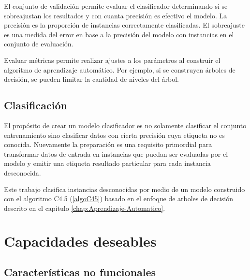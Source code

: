 El conjunto de validación permite evaluar el clasificador determinando
si se sobreajustan los resultados y con cuanta precisión es efectivo
el modelo. La precisión es la proporción de instancias correctamente
clasificadas. El sobreajuste es una medida del error en base a la
precisión del modelo con instancias en el conjunto de evaluación.

Evaluar métricas permite realizar ajustes a los parámetros al construir
el algoritmo de aprendizaje automático. Por ejemplo, si se construyen
árboles de decisión, se pueden limitar la cantidad de niveles del
árbol.

\subsection{Clasificación}

El propósito de crear un modelo clasificador es no solamente clasificar
el conjunto entrenamiento sino clasificar datos con cierta precisión
cuya etiqueta no es conocida. Nuevamente la preparación es una requisito
primordial para transformar datos de entrada en instancias que puedan
ser evaluadas por el modelo y emitir una etiqueta resultado particular
para cada instancia desconocida.

Este trabajo clasifica instancias desconocidas por medio de un modelo
construido con el algoritmo C4.5 (\ref{algoC45}) basado en el enfoque
de arboles de decisión descrito en el capitulo \ref{chap:Aprendizaje-Automatico}.

\section{Capacidades deseables}

\subsection{Características no funcionales}

